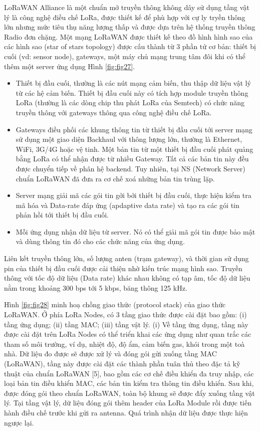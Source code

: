 LoRaWAN Alliance là một chuẩn mở truyền thông không dây sử dụng tầng vật lý là công nghệ điều chế LoRa, được thiết kế để phù hợp với cự ly tryền thông lớn nhưng mức tiêu thụ năng lượng thấp và được dựa trên hệ thống truyền thông Radio đơn chặng. Một mạng LoRaWAN được thiết kế theo đồ hình hình sao của các hình sao (star of stars topology) được cấu thành từ 3 phần tử cơ bản: thiết bị cuối (vd: sensor node), gateways, một máy chủ mạng trung tâm đôi khi có thể thêm một server ứng dụng Hình \ref{fig:fig27}.
\begin{itemize}
\item	Thiết bị đầu cuối, thường là các nút mạng cảm biến, thu thập dữ liệu vật lý từ các hệ cảm biến. Thiết bị đầu cuối này có tích hợp module truyền thông LoRa (thường là các dòng chip thu phát LoRa của Semtech) có chức năng truyền thông với gateways thông qua công nghệ điều chế LoRa.
\item	Gateways điều phối các khung thông tin từ thiết bị đầu cuối tới server mạng sử dụng một giao diện Backhaul với thông lượng lớn, thường là Ethernet, WiFi, 3G/4G hoặc vệ tinh. Một bản tin từ một thiết bị đầu cuối phát quảng bằng LoRa có thể nhận được từ nhiều Gateway. Tất cả các bản tin này đều được chuyển tiếp về phân hệ backend. Tuy nhiên, tại NS (Network Server) chuẩn LoRaWAN đã đưa ra cơ chế xoá những bản tin trùng lặp.
\item	Server mạng giải mã các gói tin gởi bởi thiết bị đầu cuối, thực hiện kiểm tra mã hóa và Data-rate đáp ứng (apdaptive data rate) và tạo ra các gói tin phản hồi tới thiết bị đầu cuối.
\item	Mỗi ứng dụng nhận dữ liệu từ server. Nó có thể giải mã gói tin được bảo mật và dùng thông tin đó cho các chức năng của ứng dụng.
\end{itemize}
Liên kết truyền thông lớn, số lượng anten (trạm gateway), và thời gian sử dụng pin của thiết bị đầu cuối được cải thiện nhờ kiến trúc mạng hình sao. Truyền thông với tốc độ dữ liệu (Data rate) khác nhau không có tạp âm, tốc độ dữ liệu nằm trong khoảng 300 bps tới 5 kbps, băng thông 125 kHz. \par 
	Hình \ref{fig:fig28} minh hoạ chồng giao thức (protocol stack) của giao thức LoRaWAN. Ở phía LoRa Nodes, có 3 tầng giao thức được cài đặt bao gồm: (i) tầng ứng dụng; (ii) tầng MAC; (iii) tầng vật lý. (i) Về tầng ứng dụng, tầng này được cài đặt trên LoRa Nodes có thể triển khai các ứng dụng như quan trắc các tham số môi trường, ví dụ, nhiệt độ, độ ẩm, cảm biến gas, khói trong một toà nhà. Dữ liệu đo được sẽ được xử lý và đóng gói gửi xuống tầng MAC (LoRaWAN), tầng này được cài đặt các thành phần tuân thủ theo đặc tả kỹ thuật của chuẩn LoRaWAN [5], bao gồm các cơ chế điều khiển đa truy nhập, các loại bản tin điều khiển MAC, các bản tin kiểm tra thông tin điều khiển. Sau khi, được đóng gói theo chuẩn LoRaWAN, toàn bộ khung sẽ được đẩy xuống tầng vật lý. Tại tầng vật lý, dữ liệu đóng gói thêm header của LoRa Module rồi được tiến hành điều chế trước khi gửi ra antenna. Quá trình nhận dữ liệu được thực hiện ngược lại.\par
